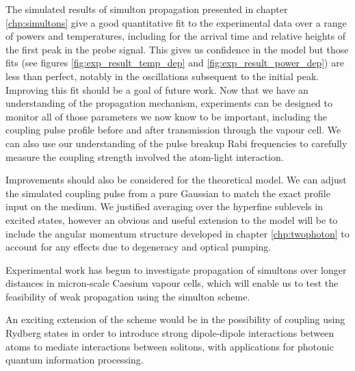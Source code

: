   The simulated results of simulton propagation presented in chapter
  \ref{chp:simultons} give a good quantitative fit to the experimental data over
  a range of powers and temperatures, including for the arrival time and
  relative heights of the first peak in the probe signal. This gives us
  confidence in the model but those fits (see figures
  \ref{fig:exp_result_temp_dep} and \ref{fig:exp_result_power_dep}) are less
  than perfect, notably in the oscillations subsequent to the initial peak.
  Improving this fit should be a goal of future work. Now that we have an
  understanding of the propagation mechanism, experiments can be designed to
  monitor all of those parameters we now know to be important, including the
  coupling pulse profile before and after transmission through the vapour cell.
  We can also use our understanding of the pulse breakup Rabi frequencies to
  carefully measure the coupling strength involved the atom-light interaction.
  
  Improvements should also be considered for the theoretical model. We can
  adjust the simulated coupling pulse from a pure Gaussian to match the exact
  profile input on the medium. We justified averaging over the hyperfine
  sublevels in excited states, however an obvious and useful extension to the
  model will be to include the angular momentum structure developed in chapter
  \ref{chp:twophoton} to account for any effects due to degeneracy and optical
  pumping.

  Experimental work has begun to investigate propagation of simultons over
  longer distances in micron-scale Caesium vapour cells, which will enable us to
  test the feasibility of weak propagation using the simulton scheme. 

  An exciting extension of the scheme would be in the possibility of coupling
  using Rydberg states in order to introduce strong dipole-dipole interactions
  between atoms to mediate interactions between solitons, with applications for
  photonic quantum information
  processing.\cite{Maxwell2013,Maghrebi2015,Peyronel2012}
